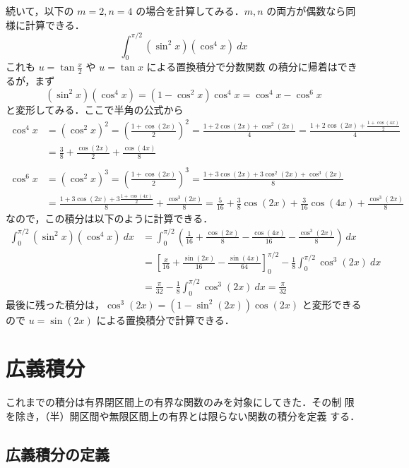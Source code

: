 \documentclass[10pt, uplatex, dvipdfmx]{jsarticle}
\theoremstyle{definition}
\numberwithin{equation}{section}
\newcommand{\ds}{\displaystyle}
\begin{document}
  続いて，以下の $m=2,n=4$ の場合を計算してみる．$m,n$ の両方が偶数なら同様に計算できる．
  \[
    \int_{0}^{\pi/2} \left( \sin^2 x\right) \left( \cos^4 x\right) \ dx
  \]
  これも $\ds u=\tan\frac{x}{2}$ や $u=\tan x$ による置換積分で分数関数
  の積分に帰着はできるが，まず
  \[
    \left( \sin^2 x\right) \left( \cos^4 x\right) = \left( 1-\cos^2 x\right) \cos^4 x  = \cos^4x - \cos^6 x
  \]
  と変形してみる．ここで半角の公式から
  \[
    \begin{aligned}
      \cos^4 x &= \left( \cos^2 x\right)^2 =
      \left(\frac{1+\cos(2x)}{2}\right)^2 = \frac{1+2\cos(2x) +
        \cos^2(2x)}{4}
      = \frac{1+2\cos(2x) + \frac{1+\cos(4x)}{2}}{4}\\
      &= \frac{3}{8} + \frac{\cos (2x)}{2} + \frac{\cos (4x)}{8}\\ \\
      \cos^6 x &= \left( \cos^2 x\right)^3 = \left(
        \frac{1+\cos(2x)}{2}\right)^3 = \frac{1+3\cos(2x) +
        3\cos^2(2x) + \cos^3(2x)}{8}\\
      &= \frac{1+3\cos(2x) + 3 \frac{1+\cos(4x)}{2}}{8} + \frac{\cos^3(2x)}{8}
      = \frac{5}{16} + \frac{3}{8}\cos(2x) + \frac{3}{16}\cos(4x) + \frac{\cos^3(2x)}{8}
    \end{aligned}
  \]
  なので，この積分は以下のように計算できる．
  \[
    \begin{aligned}
      \int_{0}^{\pi/2} \left(\sin^2 x\right)\left(\cos^4x\right) \ dx
      &= \int_{0}^{\pi/2}\left( \frac{1}{16} + \frac{\cos(2x)}{8} - \frac{\cos(4x)}{16} - \frac{\cos^3(2x)}{8}\right) \ dx\\
      &= \left[\frac{x}{16} + \frac{\sin(2x)}{16} - \frac{\sin(4x)}{64}\right]_{0}^{\pi/2}
      - \frac{1}{8}\int_{0}^{\pi/2}\cos^3(2x) \ dx\\
      & = \frac{\pi}{32} - \frac{1}{8}\int_{0}^{\pi/2}\cos^3(2x) \ dx = \frac{\pi}{32}
    \end{aligned}
  \]
  最後に残った積分は，$\cos^3(2x) = \left(1-\sin^2(2x)\right)
  \cos(2x)$ と変形できるので $u=\sin(2x)$ による置換積分で計算できる．
 

  \section{広義積分}\label{sec:imporper}

  これまでの積分は有界閉区間上の有界な関数のみを対象にしてきた．その制
  限を除き，（半）開区間や無限区間上の有界とは限らない関数の積分を定義
  する．


\subsection{広義積分の定義}
\end{document}
